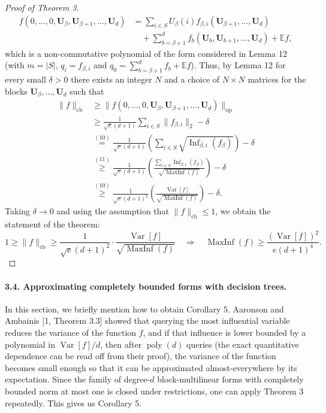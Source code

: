 \begin{proof}[Proof of Theorem 3]
\begin{align*}
f(0,\ldots,0,\mathbf U_\beta,\mathbf U_{\beta+1},\ldots,\mathbf U_d)
&=\sum_{i\in S}U_\beta(i)f_{\beta,i}(\mathbf U_{\beta+1},\ldots,\mathbf U_d)\\
&\quad+\sum_{b=\beta+1}^df_b(\mathbf U_b,\mathbf U_{b+1},\ldots,\mathbf U_d)+\mathbb Ef,
\end{align*}
which is a non-commutative polynomial of the form considered in Lemma 12 (with $m=|S|$, $q_i=f_{\beta,i}$ and $q_0=\sum_{b=\beta+1}^df_b+\mathbb Ef$). Thus, by Lemma 12 for every small $\delta>0$ there exists an integer $N$ and a choice of $N\times N$ matrices for the blocks $\mathbf U_\beta,\ldots,\mathbf U_d$ such that
\begin{align*}
\|f\|_{\mathrm{cb}}&\geq\|f(0,\ldots,0,\mathbf U_\beta,\mathbf U_{\beta+1},\ldots,\mathbf U_d)\|_{\mathrm{op}}\\
&\geq\frac1{\sqrt e(d+1)}\sum_{i\in S}\|f_{\beta,i}\|_2-\delta\\
&\overset{(10)}=\frac1{\sqrt e(d+1)}\left(\sum_{i\in S}\sqrt{\operatorname{Inf}_{\beta,i}(f_\beta)}\right)-\delta\\
&\overset{(11)}\geq\frac1{\sqrt e(d+1)}\left(\frac{\sum_{i\in S}\operatorname{Inf}_{\beta,i}(f_\beta)}{\sqrt{\operatorname{MaxInf}(f)}}\right)-\delta\\
&\overset{(10)}\geq\frac1{\sqrt e(d+1)^2}\left(\frac{\operatorname{Var}[f]}{\sqrt{\operatorname{MaxInf}(f)}}\right)-\delta.
\end{align*}
Taking $\delta\to0$ and using the assumption that $\|f\|_{\mathrm{cb}}\leq1$, we obtain the statement of the theorem:
\[1\geq\|f\|_{\mathrm{cb}}\geq\frac1{\sqrt e(d+1)^2}\cdot\frac{\operatorname{Var}[f]}{\sqrt{\operatorname{MaxInf}(f)}}\quad\Longrightarrow\quad\operatorname{MaxInf}(f)\geq\frac{(\operatorname{Var}[f])^2}{e(d+1)^4}.\]
\end{proof}
\paragraph{3.4. Approximating completely bounded forms with decision trees.}
In this section, we briefly mention how to obtain Corollary 5. Aaronson and Ambainis [1, Theorem 3.3] showed that querying the most influential variable reduces the variance of the function $f$, and if that influence is lower bounded by a polynomial in $\operatorname{Var}[f]/d$, then after $\operatorname{poly}(d)$ queries (the exact quantitative dependence can be read off from their proof), the variance of the function becomes small enough so that it can be approximated almost-everywhere by its expectation. Since the family of degree-$d$ block-multilinear forms with completely bounded norm at most one is closed under restrictions, one can apply Theorem 3 repeatedly. This gives us Corollary 5.
